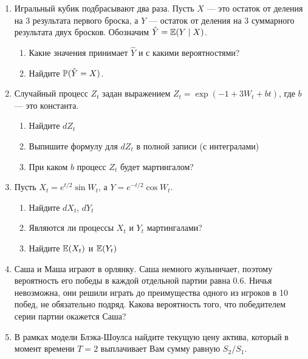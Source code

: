 \documentclass[pdftex,12pt,a4paper]{article}
\begin{document}
\begin{enumerate}
\item Игральный кубик подбрасывают два раза. Пусть $X$ --- это остаток от деления на 3 результата первого броска, а $Y$ --- остаток от деления на 3 суммарного результата двух бросков. Обозначим $\hat{Y}=\E( Y \mid X)$. 
\begin{enumerate}
\item Какие значения принимает $\hat{Y}$ и с какими вероятностями? 
\item Найдите $\P(\hat{Y}=X)$.
\end{enumerate}

\item Случайный процесс $Z_t$ задан выражением $Z_t=\exp(-1+3W_t+bt)$, где $b$ --- это константа. 
\begin{enumerate}
\item Найдите $dZ_t$
\item Выпишите формулу для $dZ_t$ в полной записи (с интегралами)
\item При каком $b$ процесс $Z_t$ будет мартингалом?
\end{enumerate}

\item Пусть $X_t=e^{t/2}\sin W_t$,  а $Y=e^{-t/2}\cos W_t$. 
\begin{enumerate}
\item Найдите $dX_t$, $dY_t$
\item Являются ли процессы $X_t$ и $Y_t$ мартингалами?
\item Найдите $\E(X_t)$ и $\E(Y_t)$
\end{enumerate}

\item Саша и Маша играют в орлянку. Саша немного жульничает, поэтому вероятность его победы в каждой отдельной партии равна $0.6$. Ничья невозможна, они решили играть до преимущества одного из игроков в 10 побед, не обязательно подряд. Какова вероятность того, что победителем серии партии окажется Саша?


\item  В рамках модели Блэка-Шоулса найдите текущую цену актива, который в момент времени $T=2$ выплачивает Вам  сумму равную $S_2/S_1$.




\end{enumerate}
\end{document}
